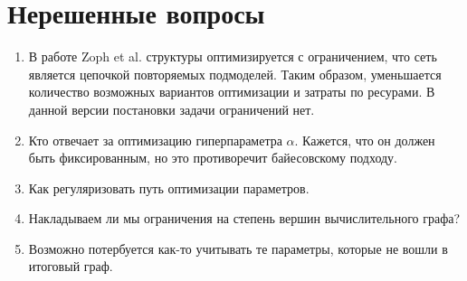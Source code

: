 \documentclass[12pt]{article}
\begin{document}
\section{Нерешенные вопросы}
\begin{enumerate}
\item В работе Zoph et al. структуры оптимизируется с ограничением, что сеть является цепочкой повторяемых подмоделей. Таким образом, уменьшается количество возможных вариантов оптимизации и затраты по ресурами. В данной версии постановки задачи ограничений нет.
\item Кто отвечает за оптимизацию гиперпараметра $\alpha$. Кажется, что он должен быть фиксированным, но это противоречит байесовскому подходу.
\item Как регуляризовать путь оптимизации параметров.
\item Накладываем ли мы ограничения на степень вершин вычислительного графа?
\item Возможно потербуется как-то учитывать те параметры, которые не вошли в итоговый граф.
\end{enumerate}
\end{document}
